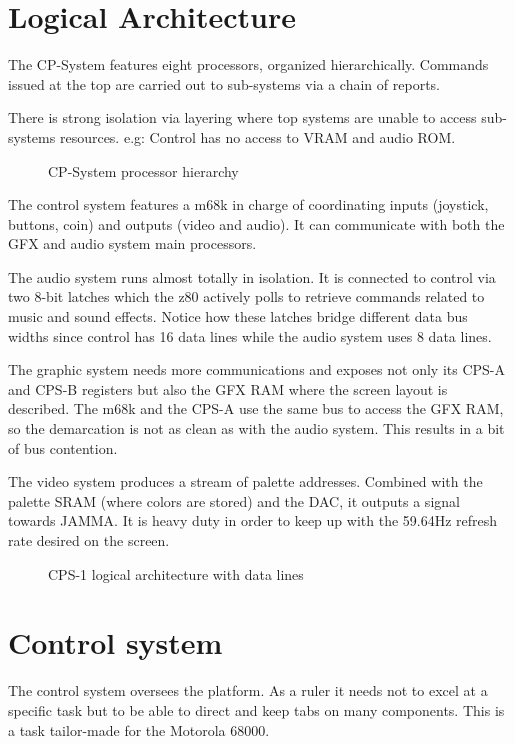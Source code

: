\section{Logical Architecture}
The CP-System features eight processors, organized hierarchically. Commands issued at the top are carried out to sub-systems via a chain of reports. 

There is strong isolation via layering where top systems are unable to access sub-systems resources. e.g: Control has no access to VRAM and audio ROM.

\begin{figure}[H]
  \caption*{CP-System processor hierarchy}
  \end{figure}


The control system features a m68k in charge of coordinating inputs (joystick, buttons, coin) and outputs (video and audio). It can communicate with both the GFX and audio system main processors.

The audio system runs almost totally in isolation. It is connected to control via two 8-bit latches which the z80 actively polls to retrieve commands related to music and sound effects. Notice how these latches bridge different data bus widths since control has 16 data lines while the audio system uses 8 data lines.

The graphic system needs more communications and exposes not only its CPS-A and CPS-B registers but also the GFX RAM where the screen layout is described. The m68k and the CPS-A use the same bus to access the GFX RAM, so the demarcation is not as clean as with the audio system. This results in a bit of bus contention.  

The video system produces a stream of palette addresses. Combined with the palette SRAM (where colors are stored) and the DAC, it outputs a signal towards JAMMA. It is heavy duty in order to keep up with the 59.64Hz refresh rate desired on the screen.

\begin{figure}[H]
  \caption*{CPS-1 logical architecture with data lines}
  \label{cps1_arch}
  \end{figure}


\section{Control system}
The control system oversees the platform. As a ruler it needs not to excel at a specific task but to be able to direct and keep tabs on many components. This is a task tailor-made for the Motorola 68000.


